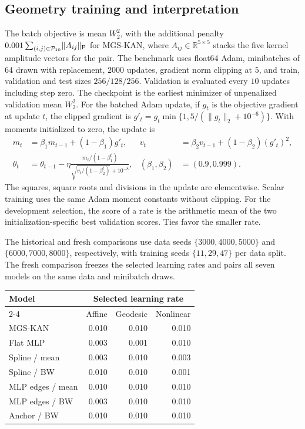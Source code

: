 \documentclass[11pt]{article}
\let\StudyMathSubsection\subsection
\newcommand{\R}{\mathbb{R}}
\newcommand{\norm}[1]{\lVert #1\rVert}
\newcommand{\setP}{\mathcal{P}}
\begin{document}
\StudyMathSubsection{Geometry training and interpretation}

The batch objective is mean \(W_2^2\), with the additional penalty
\(0.001\sum_{(i,j)\in\setP_{10}}\norm{A_{ij}}_{\rm F}\) for MGS-KAN,
where \(A_{ij}\in\R^{5\times5}\) stacks the five kernel amplitude vectors
for the pair. The benchmark uses float64 Adam, minibatches of \(64\)
drawn with replacement, \(2000\) updates, gradient norm clipping at \(5\),
and train, validation and test sizes \(256/128/256\). Validation is
evaluated every \(10\) updates including step zero. The checkpoint is the
earliest minimizer of unpenalized validation mean \(W_2^2\).
For the batched Adam update, if \(g_t\) is the objective gradient at
update \(t\), the clipped gradient is
\(g'_t=g_t\min\{1,5/(\norm{g_t}_2+10^{-6})\}\).
With moments initialized to zero, the update is
\begin{align*}
 m_t&=\beta_1m_{t-1}+(1-\beta_1)g'_t,&
 v_t&=\beta_2v_{t-1}+(1-\beta_2)(g'_t)^2,\\
 \theta_t&=\theta_{t-1}
 -\eta\frac{m_t/(1-\beta_1^t)}
             {\sqrt{v_t/(1-\beta_2^t)}+10^{-8}},
 &(\beta_1,\beta_2)&=(0.9,0.999).
\end{align*}
The squares, square roots and divisions in the update are elementwise.
Scalar training uses the same Adam moment constants without clipping.
For the development selection, the score of a rate is the arithmetic
mean of the two initialization-specific best validation scores. Ties
favor the smaller rate.

The historical and fresh comparisons use data seeds
\(\{3000,4000,5000\}\) and \(\{6000,7000,8000\}\), respectively, with
training seeds \(\{11,29,47\}\) per data split. The fresh comparison
freezes the selected learning rates and pairs all seven models on the
same data and minibatch draws.

\begin{center}
\begin{tabular}{@{}lrrr@{}}
\toprule
Model & \multicolumn{3}{c}{Selected learning rate}\\
\cmidrule(l){2-4}
 & Affine & Geodesic & Nonlinear\\
\midrule
MGS-KAN          & 0.010 & 0.010 & 0.010\\
Flat MLP         & 0.003 & 0.001 & 0.010\\
Spline / mean    & 0.003 & 0.010 & 0.003\\
Spline / BW      & 0.010 & 0.010 & 0.001\\
MLP edges / mean & 0.010 & 0.010 & 0.010\\
MLP edges / BW   & 0.003 & 0.010 & 0.010\\
Anchor / BW      & 0.010 & 0.010 & 0.010\\
\bottomrule
\end{tabular}
\end{center}
\end{document}
